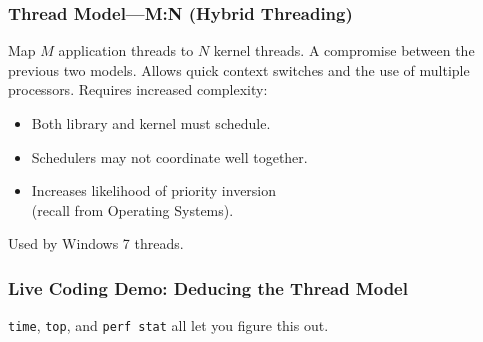 \documentclass[aspectratio=43]{beamer}
\newenvironment{changemargin}[1]{%
  \begin{list}{}{%
    \setlength{\topsep}{0pt}%
    \setlength{\leftmargin}{#1}%
    \setlength{\rightmargin}{1em}
    \setlength{\listparindent}{\parindent}%
    \setlength{\itemindent}{\parindent}%
    \setlength{\parsep}{\parskip}%
  }%
  \item[]}{\end{list}}
\begin{document}
\begin{frame}
  \frametitle{Thread Model---M:N (Hybrid Threading)}

  \begin{changemargin}{1.5cm}
    Map $M$ application threads to $N$ kernel threads.
    \vfill
    A compromise between the previous two models.
    \vfill
    Allows quick context switches and the use of multiple processors.
    \vfill
    Requires increased complexity:
    \begin{itemize}
        \item Both library and kernel must schedule.
        \item Schedulers may not coordinate well together.
        \item Increases likelihood of priority inversion\\ \hspace*{2em} (recall from Operating Systems).
      \end{itemize}
    \vfill
    Used by Windows 7 threads.
  \end{changemargin}
\end{frame}

\begin{frame}
  \frametitle{Live Coding Demo: Deducing the Thread Model}

  \begin{changemargin}{2cm}
    {\tt time}, {\tt top}, and {\tt perf stat} all let you figure this out.
  \end{changemargin}

\end{frame}
\end{document}
